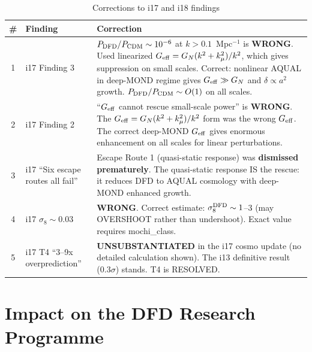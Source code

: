 \documentclass[11pt]{article}
\newcommand{\Geff}{G_{\rm eff}}
\newcommand{\kmu}{k_\mu}
\begin{document}
\begin{table}[H]
\centering
\caption{Corrections to i17 and i18 findings}
\begin{tabular}{clp{8cm}}
\toprule
\# & Finding & Correction \\
\midrule
1 & i17 Finding 3 & $P_{\rm DFD}/P_{\rm CDM} \sim 10^{-6}$ at $k > 0.1$~Mpc$^{-1}$
  is \textbf{WRONG}. Used linearized $\Geff = G_N(k^2+\kmu^2)/k^2$,
  which gives suppression on small scales. Correct: nonlinear AQUAL
  in deep-MOND regime gives $\Geff \gg G_N$ and $\delta \propto a^2$
  growth. $P_{\rm DFD}/P_{\rm CDM} \sim O(1)$ on all scales. \\
\midrule
2 & i17 Finding 2 & ``$\Geff$ cannot rescue small-scale power'' is
  \textbf{WRONG}. The $\Geff = G_N(k^2+\kmu^2)/k^2$ form was
  the wrong $\Geff$. The correct deep-MOND $\Geff$ gives
  enormous enhancement on all scales for linear perturbations. \\
\midrule
3 & i17 ``Six escape routes all fail'' & Escape Route 1 (quasi-static
  response) was \textbf{dismissed prematurely}. The quasi-static
  response IS the rescue: it reduces DFD to AQUAL cosmology with
  deep-MOND enhanced growth. \\
\midrule
4 & i17 $\sigma_8 \sim 0.03$ & \textbf{WRONG}. Correct estimate:
  $\sigma_8^{\rm DFD} \sim 1$--$3$ (may OVERSHOOT rather than
  undershoot). Exact value requires mochi\_class. \\
\midrule
5 & i17 T4 ``3--9x overprediction'' & \textbf{UNSUBSTANTIATED}
  in the i17 cosmo update (no detailed calculation shown).
  The i13 definitive result (0.3$\sigma$) stands. T4 is RESOLVED. \\
\bottomrule
\end{tabular}
\end{table}


\section*{Impact on the DFD Research Programme}
\end{document}

